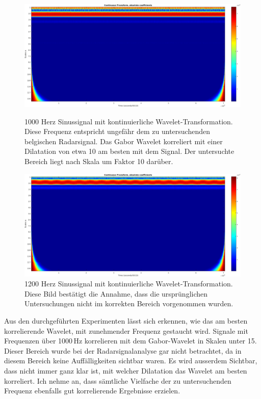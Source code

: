 \begin{refsection}
\begin{figure}
	\centering
	\includegraphics[width=1.0\linewidth]{papers/meteor/images/anomalie/beam/cwt_1000hz-clipped.png}
	\caption{1000 Herz Sinussignal mit kontinuierliche Wavelet-Transformation.
	Diese Frequenz entspricht ungefähr dem zu untersuchenden belgischen Radarsignal.
	Das Gabor Wavelet korreliert mit einer Dilatation von etwa 10 am besten mit dem Signal.
	Der untersuchte Bereich liegt nach Skala um Faktor 10 darüber.}
	\includegraphics[width=1.0\linewidth]{papers/meteor/images/anomalie/beam/cwt_1200hz-clipped.png}
	\caption{1200 Herz Sinussignal mit kontinuierliche Wavelet-Transformation.
	Diese Bild bestätigt die Annahme, dass die ursprünglichen Untersuchungen nicht im korrekten Bereich vorgenommen wurden.}
	\label{fig:cwt_anomalie_beam_2}
\end{figure}
Aus den durchgeführten Experimenten lässt sich erkennen, wie das am besten korrelierende Wavelet, mit zunehmender Frequenz gestaucht wird. 
Signale mit Frequenzen über 1000\,Hz korrelieren mit dem Gabor-Wavelet in Skalen unter 15.
Dieser Bereich wurde bei der Radarsignalanalyse gar nicht betrachtet, da in diesem Bereich keine Auffälligkeiten sichtbar waren. 
Es wird ausserdem Sichtbar, dass nicht immer ganz klar ist, mit welcher Dilatation das Wavelet am besten korreliert.
Ich nehme an, dass sämtliche Vielfache der zu untersuchenden Frequenz ebenfalls gut korrelierende Ergebnisse erzielen. 


\end{refsection}
